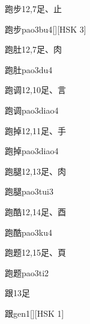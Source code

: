 \begin{entry}{跑步}{12,7}{⾜、⽌}
  \begin{phonetics}{跑步}{pao3bu4}[][HSK 3]
  \end{phonetics}
\end{entry}

\begin{entry}{跑肚}{12,7}{⾜、⾁}
  \begin{phonetics}{跑肚}{pao3du4}
  \end{phonetics}
\end{entry}

\begin{entry}{跑调}{12,10}{⾜、⾔}
  \begin{phonetics}{跑调}{pao3diao4}
  \end{phonetics}
\end{entry}

\begin{entry}{跑掉}{12,11}{⾜、⼿}
  \begin{phonetics}{跑掉}{pao3diao4}
  \end{phonetics}
\end{entry}

\begin{entry}{跑腿}{12,13}{⾜、⾁}
  \begin{phonetics}{跑腿}{pao3tui3}
  \end{phonetics}
\end{entry}

\begin{entry}{跑酷}{12,14}{⾜、⾣}
  \begin{phonetics}{跑酷}{pao3ku4}
  \end{phonetics}
\end{entry}

\begin{entry}{跑题}{12,15}{⾜、⾴}
  \begin{phonetics}{跑题}{pao3ti2}
  \end{phonetics}
\end{entry}

\begin{entry}{跟}{13}{⾜}
  \begin{phonetics}{跟}{gen1}[][HSK 1]
  \end{phonetics}
\end{entry}

